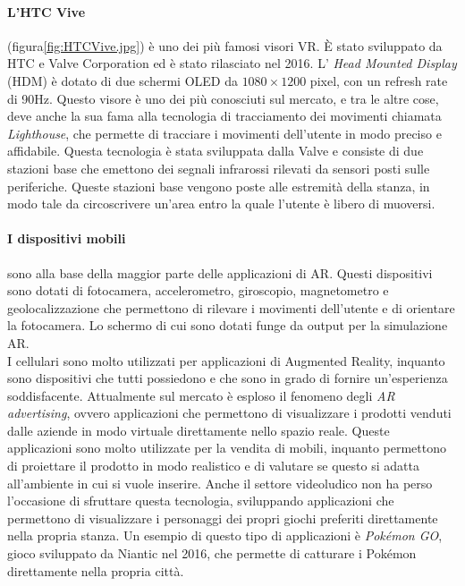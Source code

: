         \paragraph{L'HTC Vive} (figura\ref{fig:HTCVive.jpg}) è uno dei più famosi visori VR. È stato sviluppato da HTC e Valve Corporation ed è stato
            rilasciato nel 2016. L' \textit{Head Mounted Display} (HDM) è dotato di due schermi OLED da $1080\times1200$ pixel, 
            con un refresh rate di 90Hz\cite{Vive}. Questo visore è uno dei più conosciuti sul mercato, 
            e tra le altre cose, deve anche la sua fama alla tecnologia di tracciamento dei movimenti chiamata \textit{Lighthouse}, che permette di tracciare
            i movimenti dell'utente in modo preciso e affidabile. Questa tecnologia è stata sviluppata dalla Valve
            e consiste di due stazioni base che emettono dei segnali infrarossi rilevati da sensori posti 
            sulle periferiche. Queste stazioni base vengono poste alle estremità della stanza, in modo tale da circoscrivere
            un'area entro la quale l'utente è libero di muoversi.

        \paragraph{I dispositivi mobili} sono alla base della maggior parte delle applicazioni di AR. Questi dispositivi
            sono dotati di fotocamera, accelerometro, giroscopio, magnetometro e geolocalizzazione che permettono di rilevare i movimenti
            dell'utente e di orientare la fotocamera. Lo schermo di cui sono dotati funge da output per la simulazione AR.\\
            I cellulari sono molto utilizzati per applicazioni di Augmented Reality, inquanto
            sono dispositivi che tutti possiedono e che sono in grado di fornire un'esperienza soddisfacente.
            Attualmente sul mercato è esploso il fenomeno degli \textit{AR advertising}, ovvero applicazioni che permettono
            di visualizzare i prodotti venduti dalle aziende in modo virtuale direttamente nello spazio reale. Queste applicazioni
            sono molto utilizzate per la vendita di mobili, inquanto permettono di proiettare il prodotto in modo realistico
            e di valutare se questo si adatta all'ambiente in cui si vuole inserire. Anche il settore videoludico non ha 
            perso l'occasione di sfruttare questa tecnologia, sviluppando applicazioni che permettono di
            visualizzare i personaggi dei propri giochi preferiti direttamente nella propria stanza. Un esempio di questo
            tipo di applicazioni è \textit{Pokémon GO}, gioco sviluppato da Niantic nel 2016, che permette di catturare i
            Pokémon direttamente nella propria città.
            
